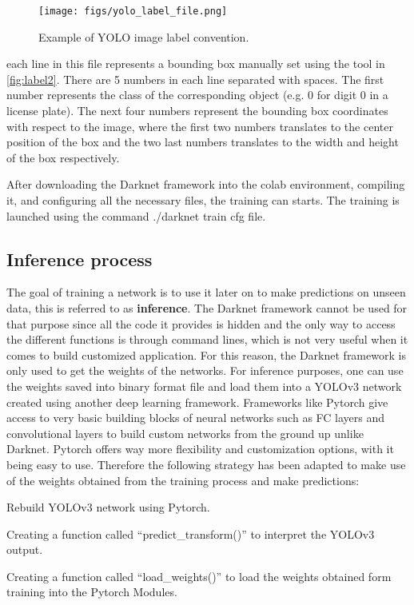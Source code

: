 \begin{figure}[!htpb]
	\centering
	\texttt{[image: figs/yolo\_label\_file.png]}
	\caption{Example of YOLO image label convention.}
	\label{fig:yolo_label_file}
\end{figure}

each line in this file represents a bounding box manually set using the tool in \cref{fig:label2}. There are 5 numbers in each line separated with spaces. The first number represents the class of the corresponding object (e.g. 0 for digit 0 in a license plate). The next four numbers represent the bounding box coordinates with respect to the image, where the first two numbers translates to the center position of the box and the two last numbers translates to the width and height of the box respectively.


After downloading the Darknet framework into the colab environment, compiling it, and configuring all the necessary files, the training can starts. The training is launched using the command ./darknet train cfg file.

\subsection{Inference process}
The goal of training a network is to use it later on to make predictions on unseen data, this is referred to as \textbf{inference}.
The Darknet framework cannot be used for that purpose since all the code it provides is hidden and the only way to
access the different functions is through command lines, which is not very useful when it comes to build
customized application. For this reason, the Darknet framework is only used to get the weights of the networks. For inference purposes, one can use the weights saved into binary format file and load them into a
YOLOv3 network created using another deep learning framework. Frameworks like Pytorch give access to very basic
building blocks of neural networks such as FC layers and convolutional layers to build custom networks from the
ground up unlike Darknet. Pytorch offers way more flexibility and customization options, with it being easy to use.
Therefore the following strategy has been adapted to make use of the weights obtained from the training process
and make predictions:

\begin{compactitem}
	\item Rebuild YOLOv3 network using Pytorch.
	\item Creating a function called ``predict\_transform()'' to interpret the YOLOv3 output.
	\item Creating a function called ``load\_weights()'' to load the weights obtained form training into the Pytorch Modules.
\end{compactitem}

